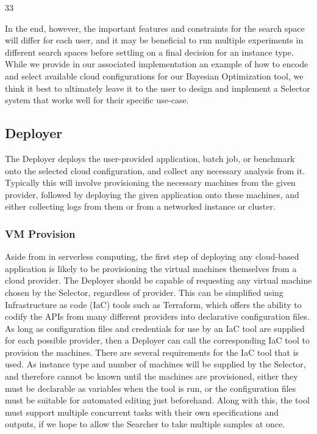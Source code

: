 33\documentclass{article}
\begin{document}
In the end,  however, the important features and constraints for the search space will differ for each user, and it may be beneficial to run multiple experiments in different search spaces before settling on a final decision for an instance type. While we provide in our associated implementation an example of how to encode and select available cloud configurations for our Bayesian Optimization tool, we think it best to ultimately leave it to the user to design and implement a Selector system that works well for their specific use-case.


\subsection{Deployer}
The Deployer deploys the user-provided application, batch job, or benchmark onto the selected cloud configuration, and collect any necessary analysis from it. Typically this will involve provisioning the necessary machines from the given provider, followed by deploying the given application onto these machines, and either collecting logs from them or from a networked instance or cluster. 

\subsubsection{VM Provision}
Aside from in serverless computing, the first step of deploying any cloud-based application is likely to be provisioning the virtual machines themselves from a cloud provider. The Deployer should be capable of requesting any virtual machine chosen by the Selector, regardless of provider. This can be simplified using Infrastructure as code (IaC) tools such as Terraform, which offers the ability to codify the APIs from many different providers into declarative configuration files. As long as configuration files and credentials for use by an IaC tool are supplied for each possible provider, then a Deployer can call the corresponding IaC tool to provision the machines. 
There are several requirements for the IaC tool that is used. As instance type and number of machines will be supplied by the Selector, and therefore cannot be known until the machines are provisioned, either they must be declarable as variables when the tool is run, or the configuration files must be suitable for automated editing just beforehand. Along with this, the tool must support multiple concurrent tasks with their own specifications and outputs, if we hope to allow the Searcher to take multiple samples at once.
\end{document}
